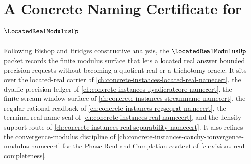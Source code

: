 \chapter{A Concrete Naming Certificate for $\LocatedRealModulusUp$}
\label{ch:concrete-instances-located-real-modulus-namecert}

Following Bishop and Bridges constructive analysis, the $\LocatedRealModulusUp$ packet records the finite modulus surface that lets a located real answer bounded precision requests without becoming a quotient real or a trichotomy oracle. It sits over the located-real carrier of \autoref{ch:concrete-instances-located-real-namecert}, the dyadic precision ledger of \autoref{ch:concrete-instances-dyadicratcore-namecert}, the finite stream-window surface of \autoref{ch:concrete-instances-streamname-namecert}, the regular rational readback of \autoref{ch:concrete-instances-regseqrat-namecert}, the terminal real-name seal of \autoref{ch:concrete-instances-real-namecert}, and the density-support route of \autoref{ch:concrete-instances-real-separability-namecert}. It also refines the convergence-modulus discipline of \autoref{ch:concrete-instances-cauchy-convergence-modulus-namecert} for the Phase Real and Completion context of \autoref{ch:visions-real-completeness}.

